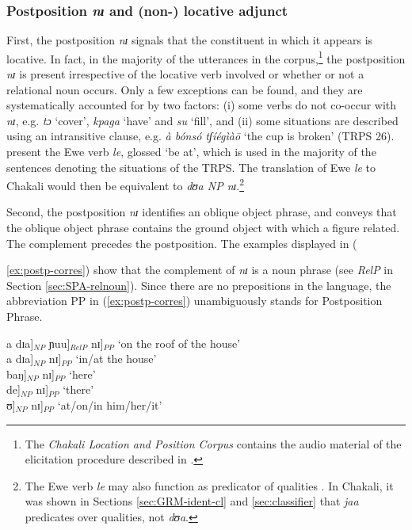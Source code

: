 \begin{exe}
\begin{exe}
\begin{exe}
\subsubsection{Postposition {\it nɪ} and (non-) locative adjunct}
\label{sec:SPA-postp}

First, the postposition {\it nɪ} signals  that the constituent in which it  
appears  is locative.  In fact, in the majority of the  utterances in the 
 corpus,\footnote{The {\it Chakali Location and Position Corpus} 
\citep{JAB-space-C-10} contains the audio material of the elicitation 
procedure described in \citet{Bowe93, Amek99, Meir01a, Meir01b}.}  the  
postposition {\it nɪ} is present irrespective of the
locative verb involved or whether or not a relational noun occurs. Only a  few
exceptions can be found,   and they are
systematically accounted for by two factors: (i) some verbs  do not co-occur 
with {\it nɪ}, e.g. {\it tɔ} `cover', {\it kpaga} `have' and {\it su} `fill',  
and (ii) some situations are described using an intransitive clause, e.g.   
{\it 
à bónsó tʃíégìàō}    `the cup is broken'  (TRPS 26).  
\citet[370]{Amek06} present the Ewe verb {\it le}, glossed  `be at',  which is 
used in the majority of the sentences denoting the situations of the TRPS.   
The 
translation of  Ewe {\it le} to Chakali would then be equivalent to {\it dʊa 
{\rm NP} nɪ}.\footnote{The Ewe verb {\it le} may also function as predicator of 
qualities \citep[373]{Amek06}. In Chakali,  it was shown  in Sections 
\ref{sec:GRM-ident-cl} and \ref{sec:classifier} that   {\it jaa} predicates 
over 
qualities,  not  {\it dʊa}.}



Second, the postposition {\it nɪ} identifies an oblique object phrase, and
 conveys that the oblique object phrase contains the ground object with which a 
figure related. The complement precedes the  postposition. The examples  
displayed in ({\ref{ex:postp-corres}) show that the complement of  {\it nɪ} is 
a 
noun phrase (see {\it RelP} in Section \ref{sec:SPA-relnoun}). Since there are 
no prepositions in the language, the abbreviation PP in 
({\ref{ex:postp-corres}}) unambiguously stands for Postposition Phrase.

\ea\label{ex:postp-corres}
 \ea {[}{[}{[}a dɪa{]}$_{NP}$ ɲuu{]}$_{RelP}$ nɪ{]}$_{PP}$  {\rm `on the roof 
of the 
house'} \\
 \ex {[}{[}a dɪa{]}$_{NP}$ nɪ{]}$_{PP}$ {\rm  `in/at the house'} \\
 \ex  {[}{[}baŋ{]}$_{NP}$ nɪ{]}$_{PP}$ {\rm  `here'}\\
 \ex {[}{[}de{]}$_{NP}$ nɪ{]}$_{PP}$  {\rm `there'}\\
 \ex {[}{[}ʊ{]}$_{NP}$ nɪ{]}$_{PP}$  {\rm `at/on/in him/her/it'}\\
\z
\z

}
\end{exe}
\end{exe}
\end{exe}
